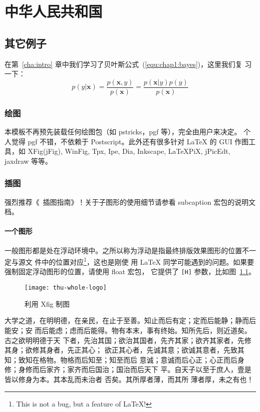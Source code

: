 \chapter{中华人民共和国}
\label{cha:china}

\section{其它例子}
\label{sec:other}

在第~\ref{cha:intro} 章中我们学习了贝叶斯公式~(\ref{equ:chap1:bayes})，这里我们复
习一下：
\begin{equation}
\label{equ:chap2:bayes}
p(y|\mathbf{x}) = \frac{p(\mathbf{x},y)}{p(\mathbf{x})}=
\frac{p(\mathbf{x}|y)p(y)}{p(\mathbf{x})}
\end{equation}

\subsection{绘图}
\label{sec:draw}

本模板不再预先装载任何绘图包（如 \textsf{pstricks，pgf} 等），完全由用户来决定。
个人觉得 \textsf{pgf} 不错，不依赖于 Postscript。此外还有很多针对 \LaTeX{} 的
 GUI 作图工具，如 XFig(jFig), WinFig, Tpx, Ipe, Dia, Inkscape, LaTeXPiX,
jPicEdt, jaxdraw 等等。

\subsection{插图}
\label{sec:graphs}

强烈推荐《\LaTeXe\ 插图指南》！关于子图形的使用细节请参看 \textsf{subcaption} 宏包的说明文档。

\subsubsection{一个图形}
\label{sec:onefig}
一般图形都是处在浮动环境中。之所以称为浮动是指最终排版效果图形的位置不一定与源文
件中的位置对应\footnote{This is not a bug, but a feature of \LaTeX!}，这也是刚使
用 \LaTeX{} 同学可能遇到的问题。如果要强制固定浮动图形的位置，请使用 \textsf{float} 宏包，
它提供了 \texttt{[H]} 参数，比如图~\ref{fig:xfig1}。
\begin{figure}[H] %
  \centering
  \texttt{[image: thu-whole-logo]}
  \caption{利用 Xfig 制图}
  \label{fig:xfig1}
\end{figure}

大学之道，在明明德，在亲民，在止于至善。知止而后有定；定而后能静；静而后能安；安
而后能虑；虑而后能得。物有本末，事有终始。知所先后，则近道矣。古之欲明明德于天
下者，先治其国；欲治其国者，先齐其家；欲齐其家者，先修其身；欲修其身者，先正其心；
欲正其心者，先诚其意；欲诚其意者，先致其知；致知在格物。物格而后知至；知至而后
意诚；意诚而后心正；心正而后身 修；身修而后家齐；家齐而后国治；国治而后天下
平。自天子以至于庶人，壹是皆以修身为本。其本乱而未治者 否矣。其所厚者薄，而其所
薄者厚，未之有也！

